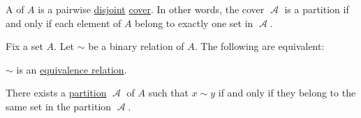 \begin{definition}\label{def:set_partition}
  A  of \( A \) is a pairwise \hyperref[def:subset_ordering]{disjoint} \hyperref[def:set_cover]{cover}. In other words, the cover \( \mscrA \) is a partition if and only if each element of \( A \) belong to exactly one set in \( \mscrA \).
\end{definition}

\begin{proposition}\label{thm:equivalence_partition}
  Fix a set \( A \). Let \( {\sim} \) be a binary relation of \( A \). The following are equivalent:
  \begin{thmenum}
     \( {\sim} \) is an \hyperref[def:equivalence_relation]{equivalence relation}.

     There exists a \hyperref[def:set_partition]{partition} \( \mscrA \) of \( A \) such that \( x \sim y \) if and only if they belong to the same set in the partition \( \mscrA \).
  \end{thmenum}
\end{proposition}
